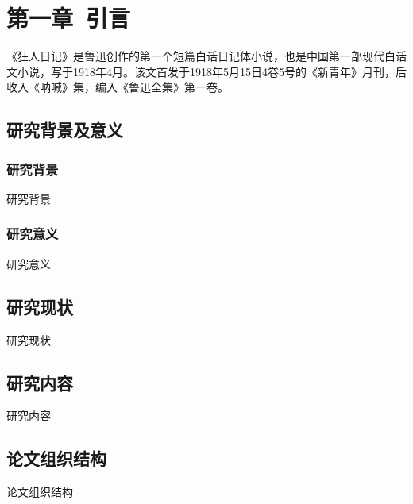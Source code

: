 \setcounter{section}{1}
\setcounter{subsection}{0}
\section*{第一章\ 引言}
《狂人日记》是鲁迅创作的第一个短篇白话日记体小说，也是中国第一部现代白话文小说，写于1918年4月。该文首发于1918年5月15日4卷5号的《新青年》月刊，后收入《呐喊》集，编入《鲁迅全集》第一卷。
\subsection{研究背景及意义}
\subsubsection{研究背景}
\cite{mnih_playing_2013}研究背景\cite{rakelly_efficient_2019}
\subsubsection{研究意义}
研究意义
\subsection{研究现状}
研究现状
\subsection{研究内容}
研究内容
\subsection{论文组织结构}
论文组织结构

\pagestyle{fancy}			%
\chead{}	%

